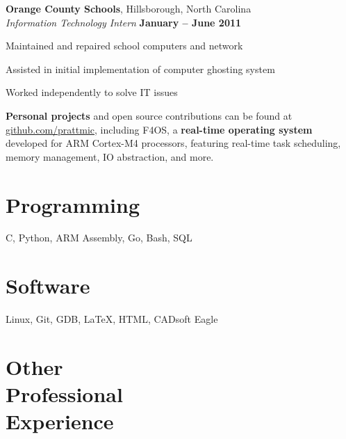 \documentclass[margin,line,letterpaper]{resume}
\begin{document}
\begin{resume}
    \textbf{Orange County Schools}, Hillsborough, North Carolina \vspace{2mm}\\\vspace{1mm}%
    \textsl{Information Technology Intern} \hfill \textbf{January -- June 2011}\vspace{-3mm}\\\vspace{-1mm}%
    \begin{list2}
    \item Maintained and repaired school computers and network
    \item Assisted in initial implementation of computer ghosting system 
    \item Worked independently to solve IT issues
    \end{list2}\vspace{-1.5mm}

    \textbf{Personal projects} and open source contributions can be found at \href{http://github.com/prattmic}{github.com/prattmic},
    including F4OS, a \textbf{real-time operating system} developed for ARM Cortex-M4 processors, featuring real-time task scheduling,
    memory management, IO abstraction, and more.


    \section{\mysidestyle Programming} 
    C, Python, ARM Assembly, Go, Bash, SQL
    \vspace{-5mm}

    \section{\mysidestyle Software} 
    Linux, Git, GDB, \LaTeX, HTML, CADsoft Eagle



    \section{\mysidestyle Other\\Professional\\Experience}


\end{resume}
\end{document}
